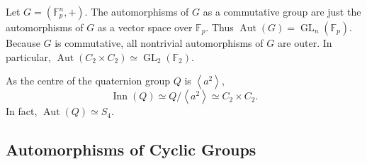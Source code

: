 \begin{example}
  \label{example-linear-space-automorphism}
  Let \( G = (\mathbb{F}^n_p, +) \).
  The automorphisms of \( G \) as a commutative group are just the automorphisms of \( G \) as a vector space over \( \mathbb{F}_p \).
  Thus \( \operatorname{Aut}(G) = \operatorname{GL}_n(\mathbb{F}_p) \).
  Because \( G \) is commutative, all nontrivial automorphisms of \( G \) are outer.
  In particular, \( \operatorname{Aut}(C_2 \times C_2) \simeq \operatorname{GL}_2(\mathbb{F}_2) \). 
\end{example}

\begin{example}
  \label{example-quaternion-group-automophism}
  As the centre of the quaternion group \( Q \) is \( \left\langle a^2 \right\rangle \),
  \[
    \operatorname{Inn}(Q) \simeq Q / \left\langle a^2 \right\rangle \simeq C_2 \times C_2.
  \]
  In fact, \( \operatorname{Aut}(Q) \simeq S_4 \).
\end{example}

\subsection{Automorphisms of Cyclic Groups}
\label{subsection-automorphisms-of-cyclic-groups}

